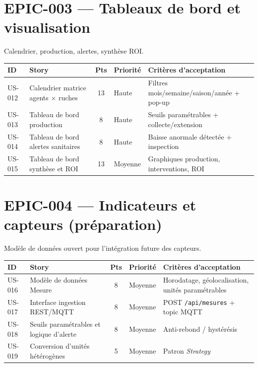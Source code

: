 \section{EPIC-003 --- Tableaux de bord et visualisation}

Calendrier, production, alertes, synthèse ROI.

\begin{center}
\begin{tabular}{lp{6.6cm}cl p{4.6cm}}
\toprule
\textbf{ID} & \textbf{Story} & \textbf{Pts} & \textbf{Priorité} & \textbf{Critères d'acceptation} \\
\midrule
US-012 & Calendrier matrice agents $\times$ ruches & 13 & Haute   & Filtres mois/semaine/saison/année + pop-up \\
US-013 & Tableau de bord production                & 8  & Haute   & Seuils paramétrables + collecte/extension \\
US-014 & Tableau de bord alertes sanitaires        & 8  & Haute   & Baisse anormale détectée + inspection \\
US-015 & Tableau de bord synthèse et ROI           & 13 & Moyenne & Graphiques production, interventions, ROI \\
\bottomrule
\end{tabular}
\end{center}

\section{EPIC-004 --- Indicateurs et capteurs (préparation)}

Modèle de données ouvert pour l'intégration future des capteurs.

\begin{center}
\begin{tabular}{lp{6.6cm}cl p{4.6cm}}
\toprule
\textbf{ID} & \textbf{Story} & \textbf{Pts} & \textbf{Priorité} & \textbf{Critères d'acceptation} \\
\midrule
US-016 & Modèle de données Mesure              & 8 & Moyenne & Horodatage, géolocalisation, unités paramétrables \\
US-017 & Interface ingestion REST/MQTT         & 8 & Moyenne & POST \texttt{/api/mesures} + topic MQTT \\
US-018 & Seuils paramétrables et logique d'alerte & 8 & Moyenne & Anti-rebond / hystérésis \\
US-019 & Conversion d'unités hétérogènes       & 5 & Moyenne & Patron \emph{Strategy} \\
\bottomrule
\end{tabular}
\end{center}


